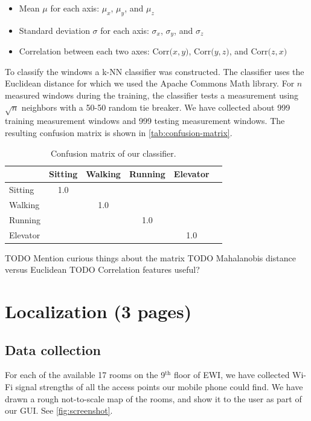 \documentclass[a4paper,10pt,twoside]{IEEEtran}
\begin{document}
\begin{itemize}
\item Mean $\mu$ for each axis: $\mu_x$, $\mu_y$, and $\mu_z$
\item Standard deviation $\sigma$ for each axis: $\sigma_x$, $\sigma_y$, and $\sigma_z$
\item Correlation between each two axes:  $\text{Corr(}x,y{)}$, $\text{Corr(}y,z{)}$, and $\text{Corr(}z,x{)}$
\end{itemize}

To classify the windows a k-NN classifier was constructed. The classifier uses the Euclidean distance for which we used the Apache Commons Math library. For $n$ measured windows during the training, the classifier tests a measurement using $\sqrt{n}$ neighbors with a 50-50 random tie breaker. We have collected about 999 training measurement windows and 999 testing measurement windows. The resulting confusion matrix is shown in \autoref{tab:confusion-matrix}.

\begin{table}[ht]
\centering
\caption{Confusion matrix of our classifier.}
\begin{tabular}{lccccc}
\toprule
& Sitting & Walking & Running & Elevator\\
\midrule
Sitting  & 1.0 &     &     &     \\
Walking  &     & 1.0 &     &     \\
Running  &     &     & 1.0 &     \\
Elevator &     &     &     & 1.0 \\
\bottomrule
\end{tabular}
\label{tab:confusion-matrix}
 \end{table}

TODO Mention curious things about the matrix
TODO Mahalanobis distance versus Euclidean
TODO Correlation features useful?

\section{Localization (3 pages)}
\label{sec:localization}

\subsection{Data collection}
\label{sec:loc-localization-method}

For each of the available 17 rooms on the 9$^{\text{th}}$ floor of EWI, we have collected Wi-Fi signal strengths of all the access points our mobile phone could find.
We have drawn a rough not-to-scale map of the rooms, and show it to the user as part of our GUI. See \autoref{fig:screenshot}.
\end{document}
